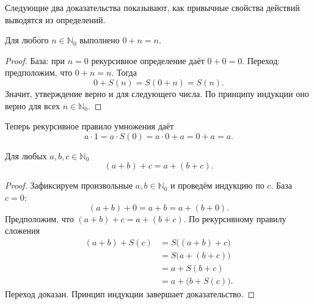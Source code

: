 Следующие два доказательства показывают, как привычные свойства действий выводятся из определений.

\begin{theorem}
Для любого \(n\in\mathbb N_0\) выполнено \(0+n=n\).
\end{theorem}

\begin{proof}
База: при \(n=0\) рекурсивное определение даёт \(0+0=0\).
Переход: предположим, что \(0+n=n\). Тогда
\[
0+S(n)=S(0+n)=S(n).
\]
Значит, утверждение верно и для следующего числа. По принципу индукции оно верно для всех \(n\in\mathbb N_0\).
\end{proof}

Теперь рекурсивное правило умножения даёт
\[
a\cdot1=a\cdot S(0)=a\cdot0+a=0+a=a.
\]

\begin{theorem}
Для любых \(a,b,c\in\mathbb N_0\)
\[
(a+b)+c=a+(b+c).
\]
\end{theorem}

\begin{proof}
Зафиксируем произвольные \(a,b\in\mathbb N_0\) и проведём индукцию по \(c\).
База \(c=0\):
\[
(a+b)+0=a+b=a+(b+0).
\]
Предположим, что \((a+b)+c=a+(b+c)\). По рекурсивному правилу сложения
\[
\begin{aligned}
(a+b)+S(c)
&=S\bigl((a+b)+c\bigr)\\
&=S\bigl(a+(b+c)\bigr)\\
&=a+S(b+c)\\
&=a+\bigl(b+S(c)\bigr).
\end{aligned}
\]
Переход доказан. Принцип индукции завершает доказательство.
\end{proof}
